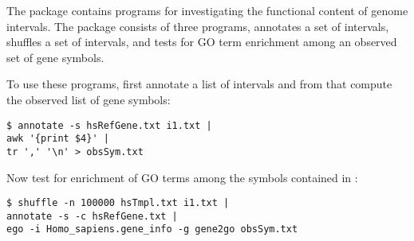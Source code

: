 The package  contains programs for investigating the
functional content of genome intervals. The package consists of three
programs,  annotates a set of intervals, 
shuffles a set of intervals, and  tests for GO term enrichment
among an observed set of gene symbols.

To use these programs, first annotate a list of intervals and from
that compute the observed list of gene symbols:
\begin{verbatim}
$ annotate -s hsRefGene.txt i1.txt | 
awk '{print $4}' | 
tr ',' '\n' > obsSym.txt
\end{verbatim}

Now test for enrichment of GO terms among the symbols contained
in :
\begin{verbatim}
$ shuffle -n 100000 hsTmpl.txt i1.txt |
annotate -s -c hsRefGene.txt |
ego -i Homo_sapiens.gene_info -g gene2go obsSym.txt
\end{verbatim}
